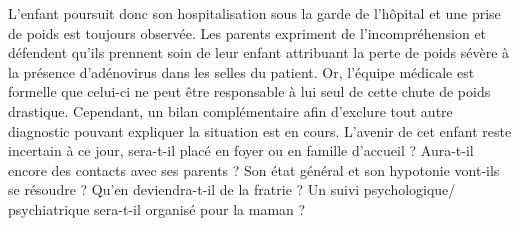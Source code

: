 L’enfant poursuit donc son hospitalisation sous la garde de l’hôpital et une prise de poids est toujours observée. Les parents expriment de l’incompréhension et défendent qu’ils prennent soin de leur enfant attribuant la perte de poids sévère à la présence d’adénovirus dans les selles du patient. Or, l’équipe médicale est formelle que celui-ci ne peut être responsable à lui seul de cette chute de poids drastique. Cependant, un bilan complémentaire afin d’exclure tout autre diagnostic pouvant expliquer la situation est en cours. L’avenir de cet enfant reste incertain à ce jour, sera-t-il placé en foyer ou en famille d’accueil ? Aura-t-il encore des contacts avec ses parents ? Son état général et son hypotonie vont-ils se résoudre ? Qu’en deviendra-t-il de la fratrie ? Un suivi psychologique/ psychiatrique sera-t-il organisé pour la maman ? \\
